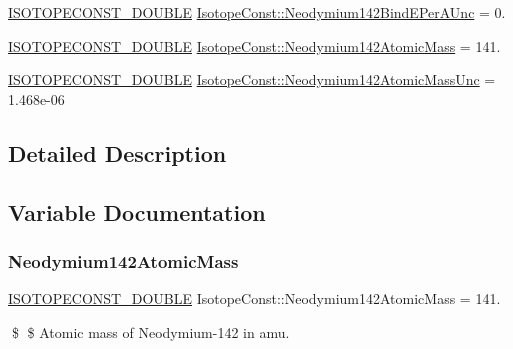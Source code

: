 \begin{DoxyCompactItemize}
\mbox{\hyperlink{group___isotope_const-_macros_ga8f45a7272ce02c0b4c65c44636ed719a}{I\+S\+O\+T\+O\+P\+E\+C\+O\+N\+S\+T\+\_\+\+D\+O\+U\+B\+LE}} \mbox{\hyperlink{group___isotope_const-_neodymium-_nd142_gaf7769a227cedf2baec8ab1a67bfc6145}{Isotope\+Const\+::\+Neodymium142\+Bind\+E\+Per\+A\+Unc}} = 0.
\item 
\mbox{\hyperlink{group___isotope_const-_macros_ga8f45a7272ce02c0b4c65c44636ed719a}{I\+S\+O\+T\+O\+P\+E\+C\+O\+N\+S\+T\+\_\+\+D\+O\+U\+B\+LE}} \mbox{\hyperlink{group___isotope_const-_neodymium-_nd142_ga17b510c02df3f3ada55e364ca451c332}{Isotope\+Const\+::\+Neodymium142\+Atomic\+Mass}} = 141.
\item 
\mbox{\hyperlink{group___isotope_const-_macros_ga8f45a7272ce02c0b4c65c44636ed719a}{I\+S\+O\+T\+O\+P\+E\+C\+O\+N\+S\+T\+\_\+\+D\+O\+U\+B\+LE}} \mbox{\hyperlink{group___isotope_const-_neodymium-_nd142_ga40e00ad13fed2aff6ad38506e4fc52a0}{Isotope\+Const\+::\+Neodymium142\+Atomic\+Mass\+Unc}} = 1.\+468e-\/06
\end{DoxyCompactItemize}


\subsection{Detailed Description}


\subsection{Variable Documentation}
\mbox{\label{group___isotope_const-_neodymium-_nd142_ga17b510c02df3f3ada55e364ca451c332}} 
\subsubsection{\texorpdfstring{Neodymium142\+Atomic\+Mass}{Neodymium142AtomicMass}}
{\footnotesize\ttfamily \mbox{\hyperlink{group___isotope_const-_macros_ga8f45a7272ce02c0b4c65c44636ed719a}{I\+S\+O\+T\+O\+P\+E\+C\+O\+N\+S\+T\+\_\+\+D\+O\+U\+B\+LE}} Isotope\+Const\+::\+Neodymium142\+Atomic\+Mass = 141.}

\$ \$ Atomic mass of Neodymium-\/142 in amu. \mbox{\label{group___isotope_const-_neodymium-_nd142_ga40e00ad13fed2aff6ad38506e4fc52a0}} 
